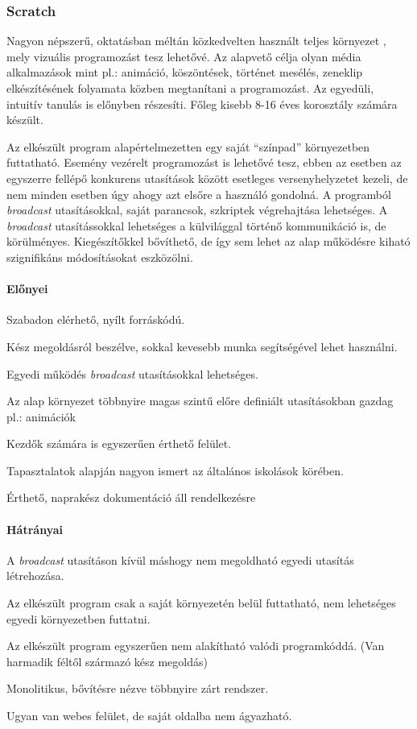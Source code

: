 \documentclass[12pt,a4paper,oneside]{report} %
\begin{document}
\subsubsection{Scratch} 
\label{scratch}
Nagyon népszerű, oktatásban méltán közkedvelten használt teljes környezet \cite{maloney2010scratch, resnick2009scratch, ScratchUrl2019Jan}, mely vizuális programozást tesz lehetővé. Az alapvető célja olyan média alkalmazások mint pl.: animáció, köszöntések, történet mesélés, zeneklip elkészítésének folyamata közben megtanítani a programozást. Az egyedüli, intuitív tanulás is előnyben részesíti. Főleg kisebb 8-16 éves korosztály számára készült. 
\par Az elkészült program alapértelmezetten egy saját ``{színpad}'' környezetben futtatható. Esemény vezérelt programozást is lehetővé tesz, ebben az esetben az egyszerre fellépő konkurens utasítások között esetleges versenyhelyzetet kezeli, de nem minden esetben úgy ahogy azt elsőre a használó gondolná.  A programból \textit{broadcast} utasításokkal, saját parancsok, szkriptek végrehajtása lehetséges. A \textit{broadcast} utasítássokkal lehetséges a külvilággal történő kommunikáció is, de körülményes. Kiegészítőkkel bővíthető, de így sem lehet az alap működésre kiható szignifikáns módosításokat eszközölni.
\paragraph{Előnyei} 
\begin{compactitem}
	\item Szabadon elérhető, nyílt forráskódú.
	\item Kész megoldásról beszélve, sokkal kevesebb munka segítségével lehet használni.
	\item Egyedi működés \textit{broadcast} utasításokkal lehetséges.
	\item Az alap környezet többnyire magas szintű előre definiált utasításokban gazdag pl.: animációk
	\item Kezdők számára is egyszerűen érthető felület.
	\item Tapasztalatok alapján nagyon ismert az általános iskolások körében.
	\item Érthető, naprakész dokumentáció áll rendelkezésre
\end{compactitem}
\paragraph{Hátrányai} 
\begin{compactitem}
	\item A \textit{broadcast} utasításon kívül máshogy nem megoldható egyedi utasítás létrehozása.
	\item Az elkészült program csak a saját környezetén belül futtatható, nem lehetséges egyedi környezetben futtatni.
	\item Az elkészült program egyszerűen nem alakítható valódi programkóddá. (Van harmadik féltől származó kész megoldás)
	\item Monolitikus, bővítésre nézve többnyire zárt rendszer.
	\item Ugyan van webes felület, de saját oldalba nem ágyazható.
\end{compactitem}
\end{document}

